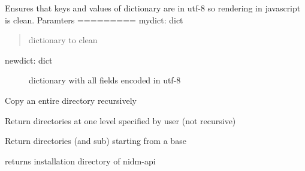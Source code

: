 \documentclass[letterpaper,10pt,english]{sphinxmanual}
\begin{document}
\begin{fulllineitems}
\label{nidm:nidm.utils.clean_fields}
Ensures that keys and values of dictionary are in utf-8
so rendering in javascript is clean.
Paramters
=========
mydict: dict
\begin{quote}

dictionary to clean
\end{quote}
\begin{description}
\item[{newdict: dict}] \leavevmode
dictionary with all fields encoded in utf-8

\end{description}

\end{fulllineitems}


\begin{fulllineitems}
\label{nidm:nidm.utils.copy_directory}
Copy an entire directory recursively

\end{fulllineitems}


\begin{fulllineitems}
\label{nidm:nidm.utils.find_directories}
Return directories at one level specified by user
(not recursive)

\end{fulllineitems}


\begin{fulllineitems}
\label{nidm:nidm.utils.find_subdirectories}
Return directories (and sub) starting from a base

\end{fulllineitems}


\begin{fulllineitems}
\label{nidm:nidm.utils.get_installdir}
returns installation directory of nidm-api

\end{fulllineitems}
\end{document}
